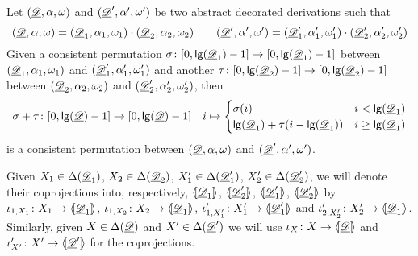 \begin{lemma}\label{lem:sum} Let $(\der{D}, \alpha, \omega)$ and $(\der{D}', \alpha', \omega')$ be two abstract decorated derivations such that
	\[(\der{D}, \alpha, \omega)=(\der{D}_1, \alpha_1, \omega_1)\cdot (\der{D}_2, \alpha_2, \omega_2) \qquad (\der{D}', \alpha', \omega')=(\der{D}'_1, \alpha'_1, \omega'_1)\cdot (\der{D}'_2, \alpha'_2, \omega'_2)\]
	Given a consistent permutation $\sigma\colon [0, \lgh(\der{D}_1)-1]\to [0, \lgh(\der{D}_1)-1]$ between  $(\der{D}_1, \alpha_1, \omega_1)$ and $(\der{D}'_1, \alpha'_1, \omega'_1)$ and another $\tau\colon [0, \lgh(\der{D}_2)-1]\to [0, \lgh(\der{D}_2)-1]$ between $(\der{D}_2, \alpha_2, \omega_2)$ and $(\der{D}'_2, \alpha'_2, \omega'_2)$, then 
	\[\sigma+\tau\colon[0, \lgh(\der{D})-1]\to[0, \lgh(\der{D})-1] \quad i \mapsto \begin{cases}
		\sigma(i) & i < \lgh(\der{D}_1)\\
		\lgh(\der{D}_1)+\tau(i-\lgh(\der{D}_1)) &   i\geq \lgh(\der{D}_1) 
	\end{cases}\]
	is a consistent permutation between $(\der{D}, \alpha, \omega)$ and $(\der{D}', \alpha', \omega')$.
\end{lemma}


\begin{notation}
Given $X_1\in \Delta(\der{D}_1)$, $X_2\in \Delta(\der{D}_2)$, $X'_1\in \Delta(\der{D}'_1)$, $X'_2\in \Delta(\der{D}'_2)$, we will denote their coprojections into, respectively, $\lpro \der{D}_1\rpro$, $\lpro \der{D}'_2\rpro$, $\lpro \der{D}'_1\rpro$, $\lpro \der{D}'_2\rpro$ by
$\iota_{1, X_1}\colon X_1\to \lpro\der{D}_1\rpro$, $\iota_{1, X_2}\colon X_2\to \lpro\der{D}_1\rpro$, $\iota'_{1, X'_1}\colon X'_1\to \lpro\der{D}'_1\rpro$ and $\iota'_{2, X'_2}\colon X'_2\to \lpro\der{D}_1\rpro$. Similarly, given $X\in \Delta(\der{D})$ and $X'\in \Delta(\der{D}')$ we will use $\iota_X\colon X\to \tpro{D}$ and $\iota'_{X'}\colon X'\to \lpro \der{D}' \rpro$ for the coprojections.
\end{notation}

